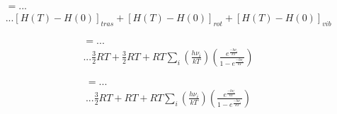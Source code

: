 \documentclass{beamer}
\begin{document}
\begin{frame}[fragile]


\begin{multline}
[H(298.15)-H(0)] =... \\... [H(T)-H(0)]_{tras}+[H(T)-H(0)]_{rot}+[H(T)-H(0)]_{vib}
\end{multline}


\begin{multline}
[H(298.15)-H(0)] =... \\... \mathrm{\frac{3}{2}} RT+ \mathrm{\frac{3}{2}} RT + RT \sum_i \left(\frac{h\nu_i}{kT}\right)\left(\frac{e^{\frac{-h\nu_i}{kT}}}{1-e^{\frac{-h\nu_i}{kT}}}\right)
\end{multline}

\begin{multline}
[H(298.15)-H(0)] =... \\... \mathrm{\frac{3}{2}} RT+  RT + RT \sum_i \left(\frac{h\nu_i}{kT}\right)\left(\frac{e^{\frac{-h\nu_i}{kT}}}{1-e^{\frac{-h\nu_i}{kT}}}\right)
\end{multline}

\end{frame}
\end{document}
